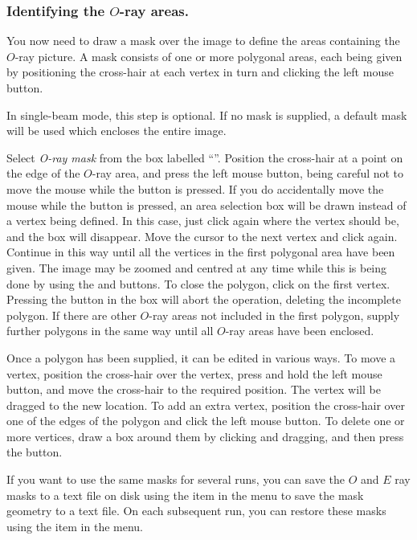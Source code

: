\documentclass[11pt,nolof]{starlink}
\providecommand{\mylabel}[1] {\xlabel{#1}\label{#1}}
\begin{document}
\subsubsection {\mylabel{TUT_O_RAY_AREAS}Identifying the $O$-ray areas.}
You now need to draw a mask over the image to define the areas containing
the $O$-ray picture. A mask consists of one or more polygonal areas, each
being given by positioning the cross-hair at each vertex in turn and
clicking the left mouse button.

In single-beam mode, this step is optional. If no mask is supplied, a
default mask will be used which encloses the entire image.

Select \emph{O-ray mask} from the box labelled ``''. Position the cross-hair at a point on the
edge of the $O$-ray area, and press the left mouse button, being careful
not to move the mouse while the button is pressed. If you do accidentally
move the mouse while the button is pressed, an area selection box will be
drawn instead of a vertex being defined. In this case, just click again
where the vertex should be, and the box will disappear. Move the cursor
to the next vertex and click again. Continue in this way until all the
vertices in the first polygonal area have been given. The image may be
zoomed and centred at any time while this is being done by using the
 and 
buttons. To close the polygon, click on the first vertex. Pressing the
 button in the  box will abort the operation,
deleting the incomplete polygon. If there are other $O$-ray areas not
included in the first polygon, supply further polygons in the same way
until all $O$-ray areas have been enclosed.

Once a polygon has been supplied, it can be edited in various ways. To
move a vertex, position the cross-hair over the vertex, press and hold
the left mouse button, and move the cross-hair to the required position.
The vertex will be dragged to the new location. To add an extra vertex,
position the cross-hair over one of the edges of the polygon and click
the left mouse button. To delete one or more vertices, draw a box around
them by clicking and dragging, and then press the  button.

If you want to use the same masks for several runs, you can save the $O$
and $E$ ray masks to a text file on disk using the
 item in the
 menu to save the mask geometry to
a text file. On each subsequent run, you can restore these masks using the
 item in the 
menu.
\end{document}
